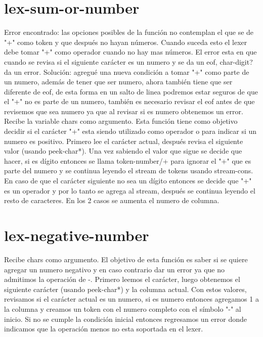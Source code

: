 \documentclass{article}
\begin{document}
\section{lex-sum-or-number}

Error encontrado: las opciones posibles de la función no contemplan el que se de "+" como token y que después no hayan números. Cuando suceda esto el lexer debe tomar "+" como operador cuando no hay mas números. El error esta en que cuando se revisa si el siguiente carácter es un numero y se da un eof, char-digit? da un error. Solución: agregué una nueva condición a tomar "+" como parte de un numero, además de tener que ser numero, ahora también tiene que ser diferente de eof, de esta forma en un salto de linea podremos estar seguros de que el "+" no es parte de un numero, también es necesario revisar el eof antes de que revisemos que sea numero ya que al revisar si es numero obtenemos un error.
\\
Recibe la variable chars como argumento. Esta función tiene como objetivo decidir si el carácter "+" esta siendo utilizado como operador o para indicar si un numero es positivo. Primero lee el carácter actual, después revisa el siguiente valor (usando peek-char*). Una vez sabiendo el valor que sigue se decide que hacer, si es dígito entonces se llama token-number/+ para ignorar el "+" que es parte del numero y se continua leyendo el stream de tokens usando stream-cons. En caso de que el carácter siguiente no sea un dígito entonces se decide que "+" es un operador y por lo tanto se agrega al stream, después se continua leyendo el resto de caracteres. En los 2 casos se aumenta el numero de columna.

\section{lex-negative-number}

Recibe chars como argumento. El objetivo de esta función es saber si se quiere agregar un numero negativo y en caso contrario dar un error ya que no admitimos la operación de -. Primero leemos el carácter, luego obtenemos el siguiente carácter (usando peek-char*) y la columna actual. Con estos valores, revisamos si el carácter actual es un numero, si es numero entonces agregamos 1 a la columna y creamos un token con el numero completo con el símbolo "-" al inicio. Si no se cumple la condición inicial entonces regresamos un error donde indicamos que la operación menos no esta soportada en el lexer.
\end{document}
